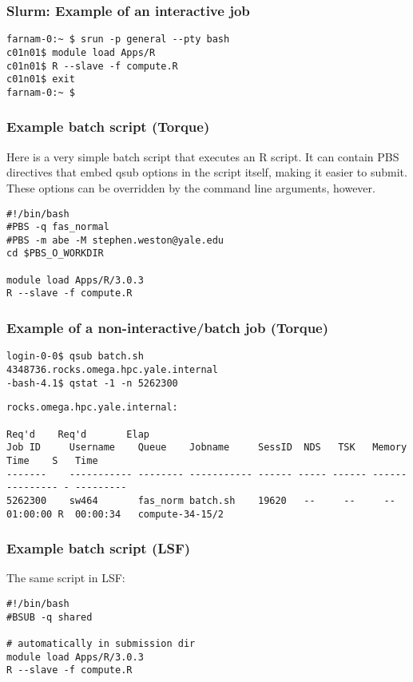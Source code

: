 \documentclass[10pt]{beamer}
\newcommand\tinyfont{\fontsize{4pt}{7.2}\selectfont}
\newcommand\smallfont{\fontsize{8pt}{7.2}\selectfont}
\begin{document}
\begin{frame}[fragile]
\frametitle{Slurm: Example of an interactive job}
\begin{verbatim}
farnam-0:~ $ srun -p general --pty bash
c01n01$ module load Apps/R
c01n01$ R --slave -f compute.R
c01n01$ exit
farnam-0:~ $
\end{verbatim}
\end{frame}

\begin{frame}[fragile]
\frametitle{Example batch script (Torque)}
Here is a very simple batch script that executes an R script.
It can contain PBS directives that embed qsub options
in the script itself, making it easier to submit.  These options
can be overridden by the command line arguments, however.

\begin{block}{}
\begin{verbatim}
#!/bin/bash
#PBS -q fas_normal
#PBS -m abe -M stephen.weston@yale.edu
cd $PBS_O_WORKDIR

module load Apps/R/3.0.3
R --slave -f compute.R
\end{verbatim}
\end{block}
\end{frame}

\begin{frame}[fragile]
\frametitle{Example of a non-interactive/batch job (Torque)}
\smallfont
\begin{verbatim}
login-0-0$ qsub batch.sh
4348736.rocks.omega.hpc.yale.internal
-bash-4.1$ qstat -1 -n 5262300
\end{verbatim}
\tinyfont
\begin{verbatim}
rocks.omega.hpc.yale.internal: 
                                                                                  Req'd    Req'd       Elap
Job ID     Username    Queue    Jobname     SessID  NDS   TSK   Memory   Time    S   Time
-------    ----------- -------- ----------- ------ ----- ------ ------ --------- - ---------
5262300    sw464       fas_norm batch.sh    19620   --     --     --   01:00:00 R  00:00:34   compute-34-15/2

\end{verbatim}
\end{frame}

\begin{frame}[fragile]
\frametitle{Example batch script (LSF)}
The same script in LSF:

\begin{block}{}
\begin{verbatim}
#!/bin/bash
#BSUB -q shared

# automatically in submission dir
module load Apps/R/3.0.3
R --slave -f compute.R
\end{verbatim}
\end{block}
\end{frame}
\end{document}
